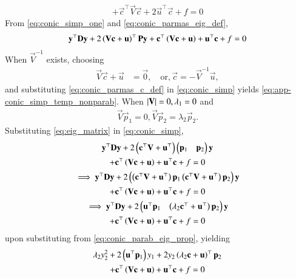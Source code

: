 \begin{enumerate}[label=\thesubsection.\arabic*.,ref=\thesubsection.\theenumi]
\begin{align}
+  \vec{c}^{\top}\vec{V}\vec{c} + 2\vec{u}^{\top}\vec{c} + f= 0
\label{eq:conic_simp_one}
\end{align}
%
From \eqref{eq:conic_simp_one} and \eqref{eq:conic_parmas_eig_def},
\begin{align}
\mathbf{y}^{\top}\mathbf{D}\mathbf{y}+2\left(\mathbf{V}\mathbf{c}+\mathbf{u}\right)^{\top}\mathbf{P}\mathbf{y}
+  \mathbf{c}^{\top}\left(\mathbf{V}\mathbf{c} + \mathbf{u}\right)+ \mathbf{u}^{\top}\mathbf{c} + f= 0
\label{eq:conic_simp}
\end{align}
When $\vec{V}^{-1}$ exists, choosing
\begin{align}
\vec{V}\vec{c}+\vec{u} &= \vec{0}, \quad \text{or}, \vec{c} = -\vec{V}^{-1}\vec{u},
\label{eq:conic_parmas_c_def}
\end{align}
%
and substituting \eqref{eq:conic_parmas_c_def}
in \eqref{eq:conic_simp}
yields \eqref{eq:app-conic_simp_temp_nonparab}. 
When $\left\vert\mathbf{V}\right\vert = 0, \lambda_1 = 0$ and 
\begin{align}
\vec{V}\vec{p}_1 = 0, 
\vec{V}\vec{p}_2 = \lambda_2\vec{p}_2.
\label{eq:conic_parab_eig_prop} 
\end{align}
Substituting \eqref{eq:eig_matrix}
in \eqref{eq:conic_simp},
\begin{multline}
	\mathbf{y}^{\top}\mathbf{D}\mathbf{y}+2\left(\mathbf{c}^{\top}\mathbf{V}+\mathbf{u}^{\top}\right)\begin{pmatrix}\mathbf{p}_1 & \mathbf{p}_2\end{pmatrix}\mathbf{y}
	\\
	+  \mathbf{c}^{\top}\left(\mathbf{V}\mathbf{c} + \mathbf{u}\right)+ \mathbf{u}^{\top}\mathbf{c} + f= 0
\\
\implies \mathbf{y}^{\top}\mathbf{D}\mathbf{y}
+2\begin{pmatrix}\left(\mathbf{c}^{\top}\mathbf{V}+\mathbf{u}^{\top}\right)\mathbf{p}_1  \left(\mathbf{c}^{\top}\mathbf{V}+\mathbf{u}^{\top}\right)\mathbf{p}_2\end{pmatrix}\mathbf{y}
\\
	+  \mathbf{c}^{\top}\left(\mathbf{V}\mathbf{c} + \mathbf{u}\right)+ \mathbf{u}^{\top}\mathbf{c} + f= 0
\\
\implies \mathbf{y}^{\top}\mathbf{D}\mathbf{y}
+2\begin{pmatrix}\mathbf{u}^{\top}\mathbf{p}_1 & \left(\lambda_2\mathbf{c}^{\top}+\mathbf{u}^{\top}\right)\mathbf{p}_2\end{pmatrix}\mathbf{y}
\\
	+  \mathbf{c}^{\top}\left(\mathbf{V}\mathbf{c} + \mathbf{u}\right)+ \mathbf{u}^{\top}\mathbf{c} + f= 0
\end{multline}
upon substituting from 
 \eqref{eq:conic_parab_eig_prop}, yielding
\begin{multline}
\lambda_2y_2^2+2\brak{\vec{u}^{\top}\vec{p}_1}y_1+  2y_2\brak{\lambda_2\vec{c}+\vec{u}}^{\top}\vec{p}_2
\\
	+  \vec{c}^{\top}\brak{\vec{V}\vec{c} + \vec{u}}+ \vec{u}^{\top}\vec{c} + f= 0

\end{multline}
\end{enumerate}

